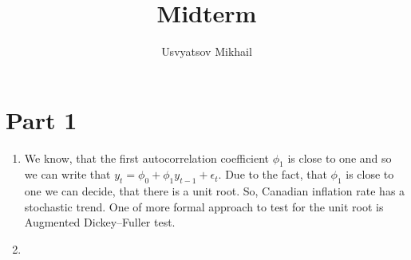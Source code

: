 \documentclass[]{article}
\title{Midterm}
\author{Usvyatsov Mikhail}
\begin{document}
\maketitle

\section{Part 1}

\begin{enumerate}
	\item
		We know, that the first autocorrelation coefficient $\phi_1$ is close to one and so we can write that $y_t=\phi_0+\phi_1 y_{t - 1}+\epsilon_t$. Due to the fact, that $\phi_1$ is close to one we can decide, that there is a unit root. So, Canadian inflation rate has a stochastic trend. One of more formal approach to test for the unit root is Augmented Dickey–Fuller test.
	\item
		
\end{enumerate}
\end{document}

